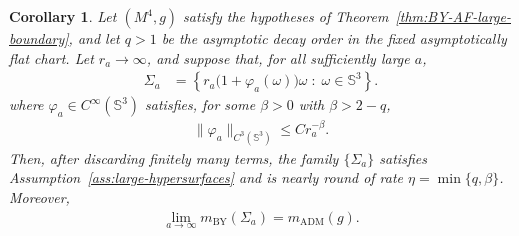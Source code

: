 \documentclass[10pt]{amsart}
\newcommand{\Sph}{\mathbb{S}}
\newcommand{\ADM}{\mathrm{ADM}}
\newcommand{\BY}{\mathrm{BY}}
\theoremstyle{plain}
\newtheorem{corollary}[theorem]{Corollary}
\theoremstyle{remark}
\begin{document}
	
	\begin{corollary}
		Let $(M^4,g)$ satisfy the hypotheses of
		Theorem~\ref{thm:BY-AF-large-boundary}, and let $q>1$ be the
		asymptotic decay order in the fixed asymptotically flat chart.
		Let $r_a\to\infty$, and suppose that, for all sufficiently large $a$,
		\begin{align*}
			\Sigma_a
			&=
			\left\{
			r_a\bigl(1+\varphi_a(\omega)\bigr)\omega
			\;:\;
			\omega\in \Sph^3
			\right\}.
		\end{align*}
		where $\varphi_a\in C^\infty(\Sph^3)$ satisfies, for some $\beta>0$
		with $\beta>2-q$,
		\begin{align*}
			\|\varphi_a\|_{C^3(\Sph^3)}
			\leq
			Cr_a^{-\beta}.
		\end{align*}
		Then, after discarding finitely many terms, the family
		$\{\Sigma_a\}$ satisfies Assumption~\ref{ass:large-hypersurfaces} and
		is nearly round of rate $\eta=\min\{q,\beta\}$. Moreover,
		\begin{align*}
			\lim_{a\to\infty}m_{\BY}(\Sigma_a)
			=
			m_{\ADM}(g).
		\end{align*}
	\end{corollary}
	
\end{document}
